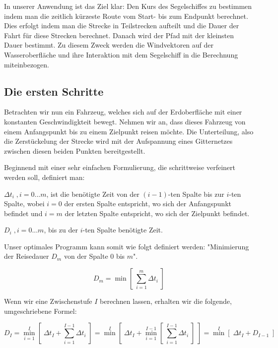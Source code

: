 \documentclass[a4paper,10pt]{article}
\begin{document}
In unserer Anwendung ist das Ziel klar: Den Kurs des Segelschiffes zu
bestimmen indem man die zeitlich kürzeste Route vom Start- bis zum
Endpunkt berechnet. Dies erfolgt indem man die Strecke in Teilstrecken
aufteilt und die Dauer der Fahrt für diese Strecken berechnet. Danach
wird der Pfad mit der kleinsten Dauer bestimmt. Zu diesem Zweck werden
die Windvektoren auf der Wasseroberfläche und ihre Interaktion mit dem
Segelschiff in die Berechnung miteinbezogen. 

\subsection{Die ersten Schritte}
Betrachten wir nun ein Fahrzeug, welches sich auf der Erdoberfläche mit einer
konstanten Geschwindigkteit bewegt. Nehmen wir an, dass dieses Fahrzeug von
einem Anfangspunkt bis zu einem Zielpunkt reisen möchte. Die Unterteilung,
also die Zerstückelung der Strecke wird mit der Aufspannung eines Gitternetzes
zwischen diesen beiden Punkten bereitgestellt.

Beginnend mit einer sehr einfachen Formulierung, die schrittweise verfeinert
werden soll, definiert man:

\( \Delta t_i\;,  i=0...m\), ist die benötigte Zeit von der \( (i-1)\)-ten
Spalte bis zur \(i\)-ten Spalte, wobei \(i=0\) der ersten Spalte entspricht,
wo sich der Anfangspunkt befindet und \(i=m\) der letzten Spalte entspricht,
wo sich der Zielpunkt befindet.


\( D_i\;,  i=0...m\), bis zu der \(i\)-ten Spalte benötigte Zeit.

Unser optimales Programm kann somit wie folgt definiert werden: "Minimierung
der Reisedauer \(D_m\) von der Spalte \(0\) bis \(m\)". 

\begin{equation}
\label{eq_dyn:1}
D_m = \min [\; \sum_{i=1}^m \Delta t_i\;]
 \end{equation}

Wenn wir eine Zwischenstufe \(I\) berechnen lassen, erhalten wir die
folgende, umgeschriebene Formel:

\begin{equation}
\label{eq_dyn:2}
D_I = \overset{I}{\underset{i=1}{\min}} [\; \Delta t_I + \sum_{i=1}^{I-1}
\Delta t_i\;] = \overset{I}{\min} [\; \Delta t_I +
\overset{I-1}{\underset{i=1}{\min}} [\; \sum_{i=1}^{I-1} \Delta t_i\;]\;] =
\overset{I}{\min} [\; \Delta t_I + D_{I-1} \;]
\end{equation}
\end{document}
